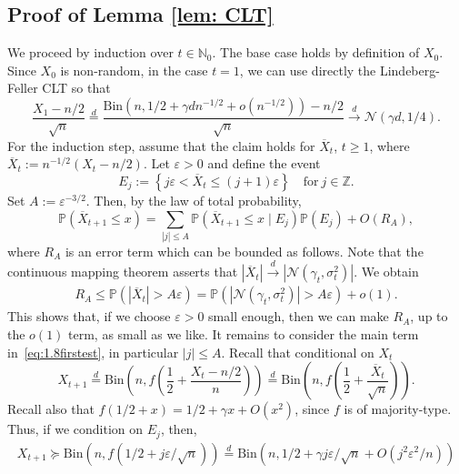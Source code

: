 \documentclass[11pt]{article}
\newcommand{\Bin}{\mathrm{Bin}}
\newcommand{\Prob}{\mathbb{P}}
\numberwithin{theorem}{section}
\begin{document}
\subsection{Proof of Lemma \ref{lem: CLT}}\label{subsec: Proof of CLT}
We proceed by induction over $t \in \mathbb{N}_0$. The base case holds by definition of $X_0$. Since $X_0$ is non-random, in the case $t=1$, we can use directly the Lindeberg-Feller CLT so that
\[
    \frac{X_1-n/2}{\sqrt{n}} \stackrel{d}{=} \frac{\Bin\left(n,1/2+\gamma d n^{-1/2}+o(n^{-1/2})\right)-n/2}{\sqrt{n}} \stackrel{d}{\to} \mathcal{N}\left(\gamma d,1/4\right).
\]
For the induction step, assume that the claim holds for $\overline{X}_t$, $t\geq1$, where $\overline{X}_t := n^{-1/2}(X_t-n/2)$. Let $\varepsilon > 0$ and define the event
\[
    E_j := \left\{ j\varepsilon < \overline{X}_t \le (j+1)\varepsilon \right\}\quad \text{for}\ j \in \mathbb{Z}.
\]
Set $A := \varepsilon^{-3/2}$. Then, by the law of total probability,
\begin{equation}
\label{eq:1.8firstest}
    \Prob\left(\overline{X}_{t+1} \leq x \right) = 
    \sum_{|j|\leq A} \Prob\left(\overline{X}_{t+1} \leq x \mid E_j \right) \Prob\left(E_j \right) + O(R_A),
\end{equation}
where $R_A$ is an error term which can be bounded as follows. Note that the continuous mapping theorem asserts that $|\overline{X}_t| \stackrel{d}{\to} |\mathcal{N}(\gamma_t,\sigma_t^2)|$. We obtain
\begin{align*}
    R_A 
    \leq \Prob\left(\left|\overline{X}_t\right| > A \varepsilon\right)  =
    \Prob\left(\left|\mathcal{N}\left(\gamma_t, \sigma_t^2\right)\right| > A \varepsilon\right) + o(1).
\end{align*}
This shows that, if we choose $\varepsilon > 0$ small enough, then we can make $R_A$, up to the $o(1)$ term, as small as we like. It remains to consider the main term in~\eqref{eq:1.8firstest}, in particular $|j|\leq A$. Recall that conditional on $X_t$
\[
    X_{t+1} \stackrel{d}{=} \Bin\left(n,f\left(\frac{1}{2}+\frac{X_t-n/2}{n}\right)\right)  \stackrel{d}{=} \Bin\left(n,f\left(\frac{1}{2}+\frac{\overline{X}_t}{\sqrt{n}}\right)\right).
\]
Recall also that $f(1/2 +x) = 1/2 +\gamma  x+O(x^2)$, since $f$ is of majority-type. Thus, if we condition on $E_j$, then,
\begin{align*}
    X_{t+1}\succeq \Bin\left(n,f\left(1/2+j\varepsilon/\sqrt{n}\right)\right) \stackrel{d}{=} \Bin\left(n,1/2 + \gamma j \varepsilon /\sqrt{n}+ O\left(j^2\varepsilon^2/n\right)\right)  
\end{align*}
\end{document}
